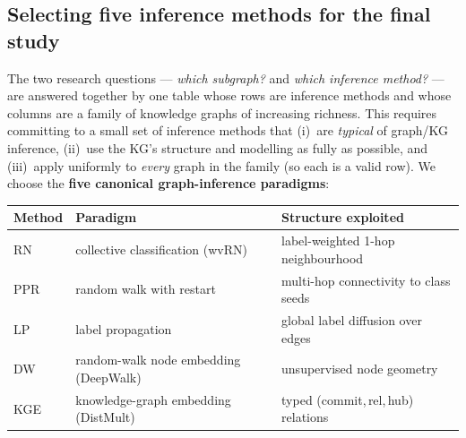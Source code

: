 \documentclass[11pt,a4paper]{article}
\begin{document}
	\subsection{Selecting five inference methods for the final study}\label{sec:v4-select5}
	The two research questions --- \emph{which subgraph?} and \emph{which inference
	method?} --- are answered together by one table whose rows are inference methods
	and whose columns are a family of knowledge graphs of increasing richness. This
	requires committing to a small set of inference methods that (i)~are
	\emph{typical} of graph/KG inference, (ii)~use the KG's structure and modelling
	as fully as possible, and (iii)~apply uniformly to \emph{every} graph in the
	family (so each is a valid row). We choose the \textbf{five canonical
	graph-inference paradigms}:
	\begin{center}\small
	\begin{tabular}{lll}
	\toprule
	Method & Paradigm & Structure exploited \\
	\midrule
	RN  & collective classification (wvRN) & label-weighted 1-hop neighbourhood \\
	PPR & random walk with restart          & multi-hop connectivity to class seeds \\
	LP  & label propagation                 & global label diffusion over edges \\
	DW  & random-walk node embedding (DeepWalk) & unsupervised node geometry \\
	KGE & knowledge-graph embedding (DistMult) & typed (commit,\,rel,\,hub) relations \\
	\bottomrule
	\end{tabular}
	\end{center}
\end{document}
